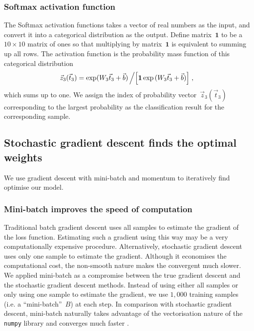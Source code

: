 \subsubsection{Softmax activation function}
The Softmax activation functions takes a vector of real numbers as the input, and convert it into a categorical distribution as the output. Define matrix~$\mathbf 1$ to be a $10\times 10$ matrix of ones so that multiplying by matrix~$\mathbf 1$ is equivalent to summing up all rows. The activation function is the probability mass function of this categorical distribution
\begin{equation}
     \vec z_{3}(\vec t_3)={\exp(W_3 \vec t_{3}+\vec b)}\left/\left[{\mathbf 1\exp{(W_3 \vec t_{3}+\vec b)}}\right]\right.,
\end{equation}
which sums up to one. We assign the index of probability vector~$\vec z_{3}(\vec t_3)$ corresponding to the largest probability as the classification result for the corresponding sample.

\subsection{Stochastic gradient descent finds the optimal weights}
We use gradient descent with mini-batch and momentum to iteratively find optimise our model.
\subsubsection{Mini-batch improves the speed of computation \label{sec:minibatch}}
Traditional batch gradient descent uses all samples to estimate the gradient of the loss function. Estimating such a gradient using this way may be a very computationally expensive procedure. Alternatively, stochastic gradient descent uses only one sample to estimate the gradient. Although it economises the computational cost, the non-smooth nature makes the convergent much slower. 
We applied mini-batch as a compromise between the true gradient descent and the stochastic gradient descent methods. 
Instead of using either all samples or only using one sample to estimate the gradient, we use $1,000$ training samples (i.e. a ``mini-batch''~$B$) at each step. 
In comparison with stochastic gradient descent, mini-batch naturally takes advantage of the vectorisation nature of the \texttt{numpy} library and converges much faster \citep{DBLP:journals/corr/GoyalDGNWKTJH17}.

